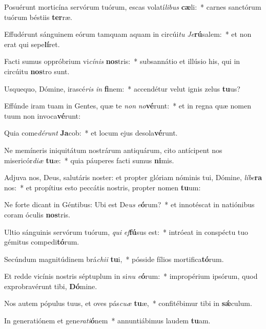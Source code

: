 \item Posuérunt morticína servórum tuórum, escas volatí\textit{li}\textit{bus} \textbf{cæ}li:~* carnes sanctórum tuórum béstiis \textbf{ter}ræ.
\item Effudérunt sánguinem eórum tamquam aquam in circúi\textit{tu} \textit{Je}\textbf{rú}salem:~* et non erat qui sepe\textbf{lí}ret.
\item Facti sumus oppróbrium vi\textit{cí}\textit{nis} \textbf{nos}tris:~* subsannátio et illúsio his, qui in circúitu \textbf{nos}tro sunt.
\item Usquequo, Dómine, irascé\textit{ris} \textit{in} \textbf{fi}nem:~* accendétur velut ignis zelus \textbf{tu}us?
\item Effúnde iram tuam in Gentes, quæ te \textit{non} \textit{no}\textbf{vé}runt:~* et in regna quæ nomen tuum non invoca\textbf{vé}runt:
\item Quia come\textit{dé}\textit{runt} \textbf{Ja}cob:~* et locum ejus desola\textbf{vé}runt.
\item Ne memíneris iniquitátum nostrárum antiquárum, cito antícipent nos misericór\textit{di}\textit{æ} \textbf{tu}æ:~* quia páuperes facti sumus \textbf{ni}mis.
\item Adjuva nos, Deus, salutáris noster: et propter glóriam nóminis tui, Dómine, \textit{lí}\textit{be}\textbf{ra} nos:~* et propítius esto peccátis nostris, propter nomen \textbf{tu}um:
\item Ne forte dicant in Géntibus: Ubi est De\textit{us} \textit{e}\textbf{ó}rum?~* et innotéscat in natiónibus coram óculis \textbf{nos}tris.
\item Ultio sánguinis servórum tuórum, \textit{qui} \textit{ef}\textbf{fú}sus est:~* intróeat in conspéctu tuo gémitus compedi\textbf{tó}rum.
\item Secúndum magnitúdinem brá\textit{chi}\textit{i} \textbf{tu}i,~* pósside fílios mortifica\textbf{tó}rum.
\item Et redde vicínis nostris séptuplum in si\textit{nu} \textit{e}\textbf{ó}rum:~* impropérium ipsórum, quod exprobravérunt tibi, \textbf{Dó}mine.
\item Nos autem pópulus tuus, et oves pás\textit{cu}\textit{æ} \textbf{tu}æ,~* confitébimur tibi in \textbf{sǽ}culum.
\item In generatiónem et gene\textit{ra}\textit{ti}\textbf{ó}nem~* annuntiábimus laudem \textbf{tu}am.
